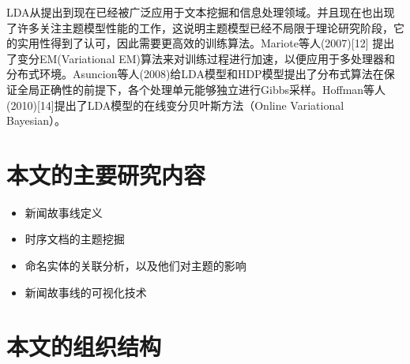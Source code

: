 LDA从提出到现在已经被广泛应用于文本挖掘和信息处理领域。并且现在也出现了许多关注主题模型性能的工作，这说明主题模型已经不局限于理论研究阶段，它的实用性得到了认可，因此需要更高效的训练算法。Mariote等人(2007)[12] 提出了变分EM(Variational EM)算法来对训练过程进行加速，以便应用于多处理器和分布式环境。Asuncion等人(2008)给LDA模型和HDP模型提出了分布式算法在保证全局正确性的前提下，各个处理单元能够独立进行Gibbs采样。Hoffman等人(2010)[14]提出了LDA模型的在线变分贝叶斯方法（Online Variational Bayesian）。

\section{本文的主要研究内容}
\begin{itemize}
\item {新闻故事线定义}
\item {时序文档的主题挖掘}
\item {命名实体的关联分析，以及他们对主题的影响}
\item {新闻故事线的可视化技术}
\end{itemize}

\section{本文的组织结构}